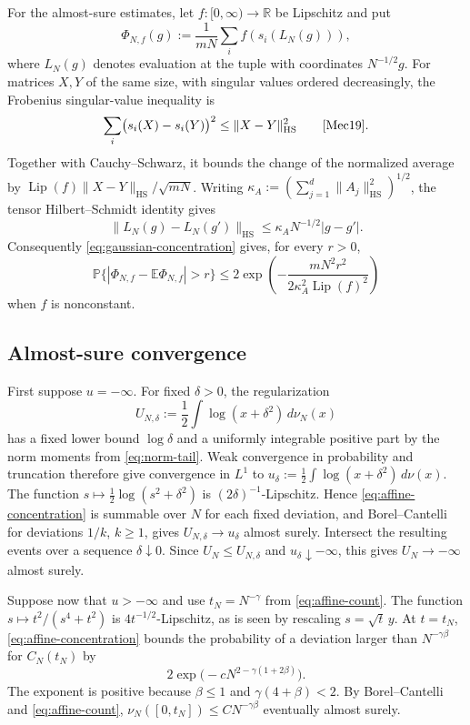 For the almost-sure estimates, let $f:[0,\infty)\to\mathbb R$ be Lipschitz and put
\[
 \Phi_{N,f}(g):=\frac1{mN}\sum_i f(s_i(L_N(g))),
\]
where $L_N(g)$ denotes evaluation at the tuple with coordinates $N^{-1/2}g$.
For matrices $X,Y$ of the same size, with singular values ordered decreasingly, the Frobenius singular-value inequality is
\[
 \sum_i\bigl(s_i(X)-s_i(Y)\bigr)^2\le \|X-Y\|_{\mathrm{HS}}^2
 \qquad\text{\cite[Corollary~4.39]{Mec19}}.
\]
Together with Cauchy--Schwarz, it bounds the change of the normalized average by $\operatorname{Lip}(f)\|X-Y\|_{\mathrm{HS}}/\sqrt{mN}$.
Writing $\kappa_A:=(\sum_{j=1}^d\|A_j\|_{\mathrm{HS}}^2)^{1/2}$, the tensor Hilbert--Schmidt identity gives
\[
 \|L_N(g)-L_N(g')\|_{\mathrm{HS}}\le \kappa_A N^{-1/2}|g-g'|.
\]
Consequently \eqref{eq:gaussian-concentration} gives, for every $r>0$,
\begin{equation}\label{eq:affine-concentration}
 \mathbb P\{|\Phi_{N,f}-\mathbb E\Phi_{N,f}|>r\}
 \le 2\exp\!\left(-\frac{mN^2r^2}{2\kappa_A^2\operatorname{Lip}(f)^2}\right)
\end{equation}
when $f$ is nonconstant.

\subsection{Almost-sure convergence}\label{subsec:affine-as}

First suppose $u=-\infty$.
For fixed $\delta>0$, the regularization
\[
 U_{N,\delta}:=\frac12\int\log(x+\delta^2)\,d\nu_N(x)
\]
has a fixed lower bound $\log\delta$ and a uniformly integrable positive part by the norm moments from \eqref{eq:norm-tail}.
Weak convergence in probability and truncation therefore give convergence in $L^1$ to $u_\delta:=\frac12\int\log(x+\delta^2)\,d\nu(x)$.
The function $s\mapsto\frac12\log(s^2+\delta^2)$ is $(2\delta)^{-1}$-Lipschitz.
Hence \eqref{eq:affine-concentration} is summable over $N$ for each fixed deviation, and Borel--Cantelli for deviations $1/k$, $k\ge1$, gives $U_{N,\delta}\to u_\delta$ almost surely.
Intersect the resulting events over a sequence $\delta\downarrow0$.
Since $U_N\le U_{N,\delta}$ and $u_\delta\downarrow-\infty$, this gives $U_N\to-\infty$ almost surely.

Suppose now that $u>-\infty$ and use $t_N=N^{-\gamma}$ from \eqref{eq:affine-count}.
The function $s\mapsto t^2/(s^4+t^2)$ is $4t^{-1/2}$-Lipschitz, as is seen by rescaling $s=\sqrt t\,y$.
At $t=t_N$, \eqref{eq:affine-concentration} bounds the probability of a deviation larger than $N^{-\gamma\beta}$ for $C_N(t_N)$ by
\[
 2\exp\bigl(-cN^{2-\gamma(1+2\beta)}\bigr).
\]
The exponent is positive because $\beta\le1$ and $\gamma(4+\beta)<2$.
By Borel--Cantelli and \eqref{eq:affine-count}, $\nu_N([0,t_N])\le C N^{-\gamma\beta}$ eventually almost surely.

